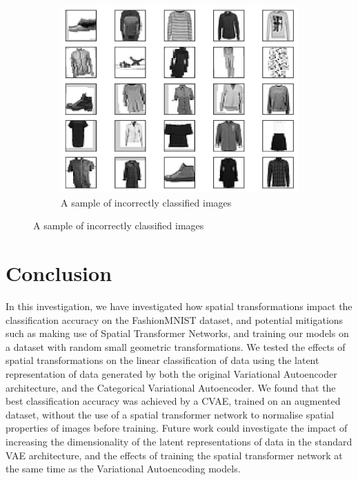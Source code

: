 \documentclass[twocolumn]{article}
\begin{document}
\begin{figure}[h!]
\begin{subfigure}[t]{0.45\columnwidth}
        \includegraphics[width=\columnwidth]{../images/incorrectly-classified.png}
        \caption{A sample of incorrectly classified images}
        \label{fig:incorrectly-classified}
    \end{subfigure}
\end{figure}

\section{Conclusion}

In this investigation, we have investigated how spatial transformations impact the classification accuracy on the FashionMNIST dataset, and potential mitigations such as making use of Spatial Transformer Networks, and training our models on a dataset with random small geometric transformations. We tested the effects of spatial transformations on the linear classification of data using the latent representation of data generated by both the original Variational Autoencoder architecture, and the Categorical Variational Autoencoder. We found that the best classification accuracy was achieved by a CVAE, trained on an augmented dataset, without the use of a spatial transformer network to normalise spatial properties of images before training. Future work could investigate the impact of increasing the dimensionality of the latent representations of data in the standard VAE architecture, and the effects of training the spatial transformer network at the same time as the Variational Autoencoding models. 

\printbibliography
\end{document}
